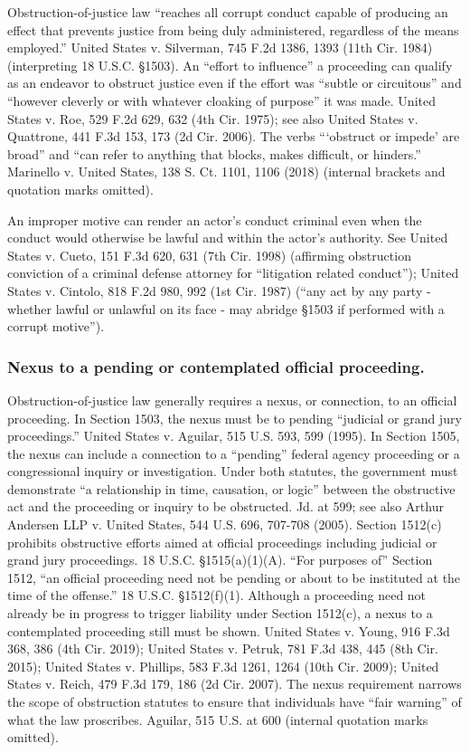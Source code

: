 Obstruction-of-justice law “reaches all corrupt conduct capable of producing an effect that prevents justice from being duly administered, regardless of the means employed.”
United States v. Silverman, 745 F.2d 1386, 1393 (11th Cir. 1984) (interpreting 18 U.S.C. \S 1503).
An “effort to influence” a proceeding can qualify as an endeavor to obstruct justice even if the effort was “subtle or circuitous” and “however cleverly or with whatever cloaking of purpose” it was made.
United States v. Roe, 529 F.2d 629, 632 (4th Cir. 1975);
see also United States v. Quattrone, 441 F.3d 153, 173 (2d Cir. 2006).
The verbs “‘obstruct or impede’ are broad” and “can refer to anything that blocks, makes difficult, or hinders.”
Marinello v. United States, 138 S. Ct. 1101, 1106 (2018) (internal brackets and quotation marks omitted).

An improper motive can render an actor’s conduct criminal even when the conduct would otherwise be lawful and within the actor’s authority.
See United States v. Cueto, 151 F.3d 620, 631 (7th Cir. 1998) (affirming obstruction conviction of a criminal defense attorney for “litigation related conduct”); United States v. Cintolo, 818 F.2d 980, 992 (1st Cir. 1987) (“any act by any party - whether lawful or unlawful on its face - may abridge \S 1503 if performed with a corrupt motive”).

\subsubsection*{Nexus to a pending or contemplated official proceeding.}

Obstruction-of-justice law generally requires a nexus, or connection, to an official proceeding.
In Section 1503, the nexus must be to pending “judicial or grand jury proceedings.”
United States v. Aguilar, 515 U.S. 593, 599 (1995).
In Section 1505, the nexus can include a connection to a “pending” federal agency proceeding or a congressional inquiry or investigation.
Under both statutes, the government must demonstrate “a relationship in time, causation, or logic” between the obstructive act and the proceeding or inquiry to be obstructed.
Jd. at 599; see also Arthur Andersen LLP v. United States, 544 U.S. 696, 707-708 (2005).
Section 1512(c) prohibits obstructive efforts aimed at official proceedings including judicial or grand jury proceedings.
18 U.S.C. \S 1515(a)(1)(A).
“For purposes of” Section 1512, “an official proceeding need not be pending or about to be instituted at the time of the offense.”
18 U.S.C. \S 1512(f)(1).
Although a proceeding need not already be in progress to trigger liability under Section 1512(c), a nexus to a contemplated proceeding still must be shown.
United States v. Young, 916 F.3d 368, 386 (4th Cir. 2019);
United States v. Petruk, 781 F.3d 438, 445 (8th Cir. 2015);
United States v. Phillips, 583 F.3d 1261, 1264 (10th Cir. 2009);
United States v. Reich, 479 F.3d 179, 186 (2d Cir. 2007).
The nexus requirement narrows the scope of obstruction statutes to ensure that individuals have “fair warning” of what the law proscribes.
Aguilar, 515 U.S. at 600 (internal quotation marks omitted).

